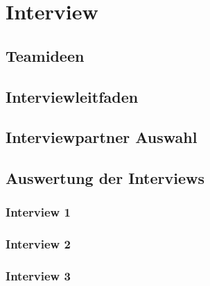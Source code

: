 
\chapter{Interview}

\section{Teamideen}

\section{Interviewleitfaden}

\section{Interviewpartner Auswahl}

\section{Auswertung der Interviews}

\subsection{Interview 1}

\subsection{Interview 2}

\subsection{Interview 3}
